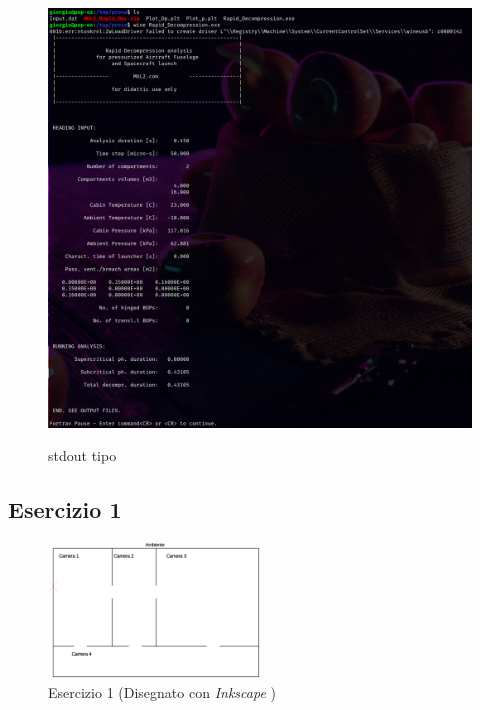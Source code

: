 \documentclass{article}
\begin{document}
    \begin{figure}[h!]
        \centering
        \label{fig:MUL2_stdout}
        \includegraphics[width=\textwidth]{MUL2_feedback.png}\\
        \caption{stdout tipo}
    \end{figure}
    




        \clearpage
        \subsection{Esercizio 1\label{Es1}} 

        \begin{figure}[h!]
            \centering
            \label{fig:Esercizio_1}
            \includegraphics[width=0.5\textwidth]{ES1_Esercizio1.eps}
            \caption{Esercizio 1 (Disegnato con \textit{Inkscape} \autocite{Inkscape})}
        \end{figure}
\end{document}
